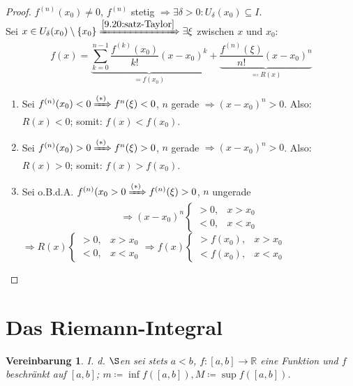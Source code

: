 \documentclass[14pt,titlepage,ngerman,a4paper,headsepline,DIV15,halfparskip*]{scrartcl}
\newcommand{\R}{\mathbb{R}}
\theoremstyle{named}
\theoremstyle{dotless}
\newtheorem*{vereinbarung}{Vereinbarung}
\begin{document}
\begin{proof}
	$f^{(n)}(x_{0}) \neq 0$, $f^{(n)}$ stetig $\Rightarrow \exists \delta > 0: U_{\delta}(x_{0}) \subseteq I$. \\
	Sei $x \in U_{\delta}(x_{0}) \setminus \{ x_{0} \} \xRightarrow[]{\ref{9.20:satz-Taylor}} \exists \xi$ zwischen $x$ und $x_{0}$:
	$$ f(x) = \underbrace{\sum_{k=0}^{n-1} \frac{f^{(k)}(x_{0})}{k!} (x - x_{0})^{k}}_{= f(x_{0})} + \underbrace{\frac{f^{(n)}(\xi)}{n!} (x - x_{0})^{n}}_{\eqqcolon R(x)} $$
	\begin{enumerate}
		\item Sei $f^{(n)}(x_{0}) < 0 \xRightarrow[]{(*)} f^{n}(\xi) < 0$, $n$ gerade $\Rightarrow (x - x_{0})^{n} > 0$. Also: $R(x) < 0$; somit: $f(x) < f(x_{0})$.
		\item Sei $f^{(n)}(x_{0}) > 0 \xRightarrow[]{(*)} f^{n}(\xi) > 0$, $n$ gerade $\Rightarrow (x - x_{0})^{n} > 0$. Also: $R(x) > 0$; somit: $f(x) > f(x_{0})$.
		\item Sei o.B.d.A. $f^{(n)}(x_{0} > 0 \xRightarrow[]{(*)} f^{(n)}(\xi) > 0$, $n$ ungerade
			$$ \Rightarrow (x - x_{0})^{n} \begin{cases} > 0, & x > x_{0} \\ < 0, & x < x_{0} \end{cases} $$
			$\Rightarrow R(x) \begin{cases} > 0, & x > x_{0} \\ < 0, & x < x_{0} \end{cases} \Rightarrow f(x) \begin{cases} > f(x_{0}), & x > x_{0} \\ < f(x_{0}), & x < x_{0} \end{cases}$
	\end{enumerate}
\end{proof}


\newpage


\section{Das Riemann-Integral}

\begin{vereinbarung}
I. d. $\S$en sei stets $a < b$, $f \colon [a, b] \rightarrow \R$ eine Funktion und $f$ beschränkt auf $[a, b]$; $m \coloneqq \inf f([a, b]), M \coloneqq \sup f([a, b])$. \\
\end{vereinbarung}
\end{document}
